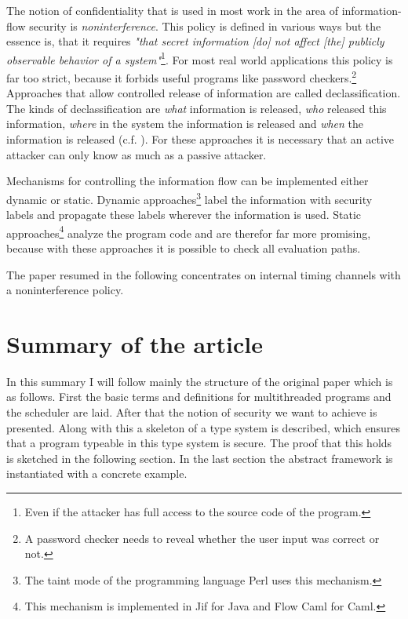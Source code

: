 \documentclass[a4paper,10pt]{llncs}
\begin{document}
The notion of confidentiality that is used in most work in the area of in\-for\-ma\-tion-flow security is \textit{noninterference}.
This policy is defined in various ways but the essence is, that it requires \textit{"that secret information
[do] not affect [the] publicly observable behavior of a system"}\cite{Zdancewic04}\footnote{Even if the attacker has full access to the
source code of the program.}. For most real world
applications this policy is far too strict, because it forbids useful programs like password checkers.\footnote{A
password checker needs to reveal whether the user input was correct or not.} Approaches that allow
controlled release of information are called declassification. The kinds of declassification are \textit{what}
information is released, \textit{who} released this information, \textit{where} in the system the information
is released and \textit{when} the information is released (c.f. \cite{Sabelfeld05}). For these approaches it is necessary that an
active attacker can only know as much as a passive attacker.

Mechanisms for controlling the information flow can be implemented either dynamic or static. Dynamic approaches\footnote{
The taint mode of the programming language Perl uses this mechanism.}
label the information with security labels and propagate these labels wherever the information is used. Static
approaches\footnote{This mechanism is implemented in Jif for Java and Flow Caml for Caml.} analyze the program code and are
therefor far more promising, because with these approaches it is possible to check all evaluation paths.

The paper resumed in the following concentrates on internal timing channels with a noninterference policy.

\section{Summary of the article}
\label{sec:discussion}
In this summary I will follow mainly the structure of the original
paper \cite{Barthe07} which is as follows. First the basic
terms and definitions for multithreaded programs and the scheduler are
laid. After that the notion of security we want to achieve is presented.
Along with this a skeleton of a type system is described, which ensures
that a program typeable in this type system is secure.
The proof that this holds is sketched in the following section.
In the last section the abstract framework is instantiated with a
concrete example.
\end{document}
